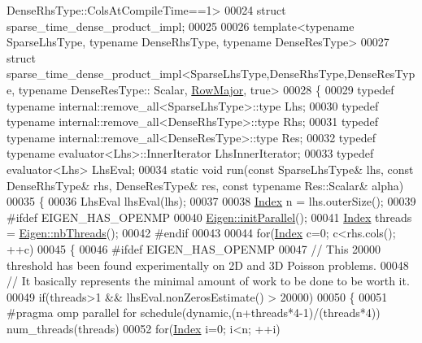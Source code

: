 \begin{DoxyCode}
      DenseRhsType::ColsAtCompileTime==1>
00024 \textcolor{keyword}{struct }sparse\_time\_dense\_product\_impl;
00025 
00026 \textcolor{keyword}{template}<\textcolor{keyword}{typename} SparseLhsType, \textcolor{keyword}{typename} DenseRhsType, \textcolor{keyword}{typename} DenseResType>
00027 \textcolor{keyword}{struct }sparse\_time\_dense\_product\_impl<SparseLhsType,DenseRhsType,DenseResType, typename DenseResType::
      Scalar, \hyperlink{group__enums_ggaacded1a18ae58b0f554751f6cdf9eb13acfcde9cd8677c5f7caf6bd603666aae3}{RowMajor}, true>
00028 \{
00029   \textcolor{keyword}{typedef} \textcolor{keyword}{typename} internal::remove\_all<SparseLhsType>::type Lhs;
00030   \textcolor{keyword}{typedef} \textcolor{keyword}{typename} internal::remove\_all<DenseRhsType>::type Rhs;
00031   \textcolor{keyword}{typedef} \textcolor{keyword}{typename} internal::remove\_all<DenseResType>::type Res;
00032   \textcolor{keyword}{typedef} \textcolor{keyword}{typename} evaluator<Lhs>::InnerIterator LhsInnerIterator;
00033   \textcolor{keyword}{typedef} evaluator<Lhs> LhsEval;
00034   \textcolor{keyword}{static} \textcolor{keywordtype}{void} run(\textcolor{keyword}{const} SparseLhsType& lhs, \textcolor{keyword}{const} DenseRhsType& rhs, DenseResType& res, \textcolor{keyword}{const} \textcolor{keyword}{typename} 
      Res::Scalar& alpha)
00035   \{
00036     LhsEval lhsEval(lhs);
00037     
00038     \hyperlink{namespace_eigen_a62e77e0933482dafde8fe197d9a2cfde}{Index} n = lhs.outerSize();
00039 \textcolor{preprocessor}{#ifdef EIGEN\_HAS\_OPENMP}
00040     \hyperlink{namespace_eigen_a820c0e0460934cc17eb6dacbad54a9f5}{Eigen::initParallel}();
00041     \hyperlink{namespace_eigen_a62e77e0933482dafde8fe197d9a2cfde}{Index} threads = \hyperlink{namespace_eigen_a9aca97d83e21b91a04ec079360dfffeb}{Eigen::nbThreads}();
00042 \textcolor{preprocessor}{#endif}
00043     
00044     \textcolor{keywordflow}{for}(\hyperlink{namespace_eigen_a62e77e0933482dafde8fe197d9a2cfde}{Index} c=0; c<rhs.cols(); ++c)
00045     \{
00046 \textcolor{preprocessor}{#ifdef EIGEN\_HAS\_OPENMP}
00047       \textcolor{comment}{// This 20000 threshold has been found experimentally on 2D and 3D Poisson problems.}
00048       \textcolor{comment}{// It basically represents the minimal amount of work to be done to be worth it.}
00049       \textcolor{keywordflow}{if}(threads>1 && lhsEval.nonZerosEstimate() > 20000)
00050       \{
00051 \textcolor{preprocessor}{        #pragma omp parallel for schedule(dynamic,(n+threads*4-1)/(threads*4)) num\_threads(threads)}
00052         \textcolor{keywordflow}{for}(\hyperlink{namespace_eigen_a62e77e0933482dafde8fe197d9a2cfde}{Index} i=0; i<n; ++i)

\end{DoxyCode}
